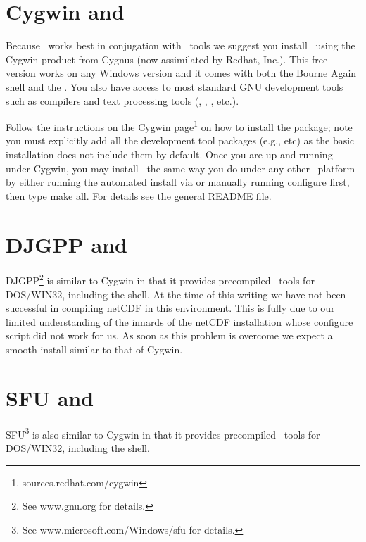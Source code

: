 \section{Cygwin and \gmt}

Because \GMT\ works best in conjugation with \UNIX\ tools we
suggest you install \GMT\ using the Cygwin product from
Cygnus (now assimilated by Redhat, Inc.).  This free version works on any Windows version
and it comes with both the Bourne Again shell  and the .
You also have access to most standard GNU development tools such
as compilers and text processing tools (,
, , etc.).

Follow the instructions on the Cygwin page\footnote{sources.redhat.com/cygwin} on how
to install the package; note you must explicitly add all the development tool
packages (e.g.,  etc) as the basic installation does not include them by default.
Once you are up and running under Cygwin, you may install \GMT\ 
the same way you do under any other \UNIX\ platform by either
running the automated install via  or manually
running configure first, then type make all.
For details see the general README file.


\section{DJGPP and \gmt}

DJGPP\footnote{See www.gnu.org for details.} is similar to Cygwin
in that it provides precompiled \UNIX\ tools for DOS/WIN32,
including the  shell.  At the time of this writing we
have not been successful in compiling netCDF in this
environment.  This is fully due to our limited understanding
of the innards of the netCDF installation whose configure
script did not work for us.  As soon as this problem is
overcome we expect a smooth install similar to that of Cygwin.

\section{SFU and \gmt}

SFU\footnote{See www.microsoft.com/Windows/sfu for details.} is also similar to Cygwin
in that it provides precompiled \UNIX\ tools for DOS/WIN32,
including the  shell.

